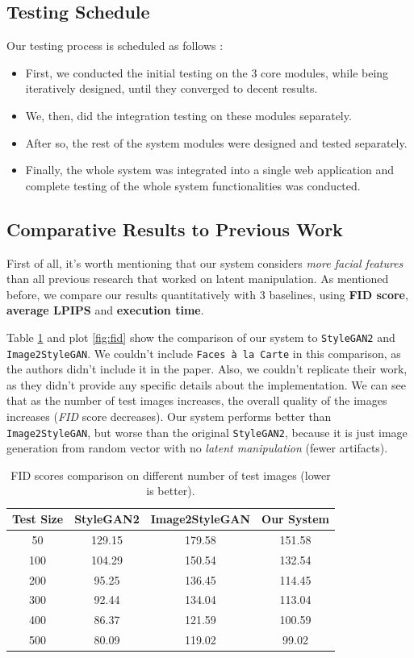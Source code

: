 \subsection{Testing Schedule}
Our testing process is scheduled as follows :
\begin{itemize}
    \item First, we conducted the initial testing on the $3$ core modules, while being iteratively designed, until they converged to decent results.
    \item We, then, did the integration testing on these modules separately.
    \item After so, the rest of the system modules were designed and tested separately.
    \item Finally, the whole system was integrated into a single web application and complete testing of the whole system functionalities was conducted.
\end{itemize}

\subsection{Comparative Results to Previous Work}
First of all, it's worth mentioning that our system considers \emph{more facial features} than all previous research that worked on latent manipulation. As mentioned before, we compare our results quantitatively with $3$ baselines, using \textbf{FID score}, \textbf{average LPIPS} and \textbf{execution time}.

Table \ref{tab:fid} and plot \ref{fig:fid} show the comparison of our system to \texttt{StyleGAN2} and \texttt{Image2StyleGAN}. We couldn't include \texttt{Faces à la Carte} in this comparison, as the authors didn't include it in the paper. Also, we couldn't replicate their work, as they didn't provide any specific details about the implementation. We can see that as the number of test images increases, the overall quality of the images increases (\emph{FID} score decreases). Our system performs better than \texttt{Image2StyleGAN}, but worse than the original \texttt{StyleGAN2}, because it is just image generation from random vector with no \emph{latent manipulation} (fewer artifacts).

\begin{table}[ht]
\centering
\begin{tabular}[t]{| c | c | c | c |}
\hline
Test Size & StyleGAN2 & Image2StyleGAN & Our System \\
\hline
50 & 129.15 & 179.58 & 151.58 \\
\hline
100 & 104.29 & 150.54 & 132.54 \\
\hline
200 & 95.25 & 136.45 & 114.45 \\
\hline
300 & 92.44 & 134.04 & 113.04 \\
\hline
400 & 86.37 & 121.59 & 100.59 \\
\hline
500 & 80.09 & 119.02 & 99.02 \\
\hline
\end{tabular}
\caption{FID scores comparison on different number of test images (lower is better).}
\label{tab:fid}
\end{table}

